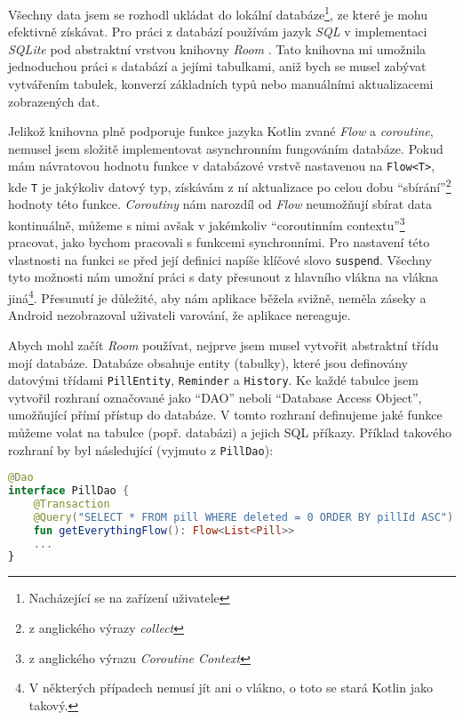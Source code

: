 \documentclass[../TakeYourPill.tex]{subfiles}
\begin{document}
Všechny data jsem se rozhodl ukládat do lokální databáze\footnote{Nacházející se na zařízení uživatele}, ze které je mohu efektivně získávat. Pro práci z databází používám jazyk \textit{SQL} v implementaci \textit{SQLite} pod abstraktní vrstvou knihovny \textit{Room} \cite{room}. Tato knihovna mi umožnila jednoduchou práci s databází a jejími tabulkami, aniž bych se musel zabývat vytvářením tabulek, konverzí základních typů nebo manuálními aktualizacemi zobrazených dat. 

Jelikož knihovna plně podporuje funkce jazyka Kotlin zvané \textit{Flow} a \textit{coroutine}, nemusel jsem složitě implementovat asynchronním fungováním databáze. Pokud mám návratovou hodnotu funkce v databázové vrstvě nastavenou na \texttt{Flow<T>}, kde \texttt{T} je jakýkoliv datový typ, získávám z ní aktualizace po celou dobu \enquote{sbírání}\footnote{z anglického výrazy \textit{collect}} hodnoty této funkce. \textit{Coroutiny} nám narozdíl od \textit{Flow} neumožňují sbírat data kontinuálně, můžeme s nimi avšak v jakémkoliv \enquote{coroutinním contextu}\footnote{z anglického výrazu \textit{Coroutine Context}} pracovat, jako bychom pracovali s funkcemi synchronními. Pro nastavení této vlastnosti na funkci se před její definici napíše klíčové slovo \texttt{suspend}. Všechny tyto možnosti nám umožní práci s daty přesunout z hlavního vlákna na vlákna jiná\footnote{V některých případech nemusí jít ani o vlákno, o toto se stará Kotlin jako takový.}. Přesunutí je důležité, aby nám aplikace běžela svižně, neměla záseky a Android nezobrazoval uživateli varování, že aplikace nereaguje.

Abych mohl začít \textit{Room} používat, nejprve jsem musel vytvořit abstraktní třídu mojí databáze. Databáze obsahuje entity (tabulky), které jsou definovány datovými třídami \texttt{PillEntity}, \texttt{Reminder} a \texttt{History}. Ke každé tabulce jsem vytvořil rozhraní označované jako \enquote{DAO} neboli \enquote{Database Access Object}, umožňující přímí přístup do databáze. V tomto rozhraní definujeme jaké funkce můžeme volat na tabulce (popř. databázi) a jejich SQL příkazy. Příklad takového rozhraní by byl následující (vyjmuto z \texttt{PillDao}):

\setmonofont{JetBrains Mono}
\begin{lstlisting}[language=Kotlin]
@Dao
interface PillDao {
    @Transaction
    @Query("SELECT * FROM pill WHERE deleted = 0 ORDER BY pillId ASC")
    fun getEverythingFlow(): Flow<List<Pill>>
    ...
}
\end{lstlisting}
\setmonofont{Latin Modern Mono}
\end{document}
